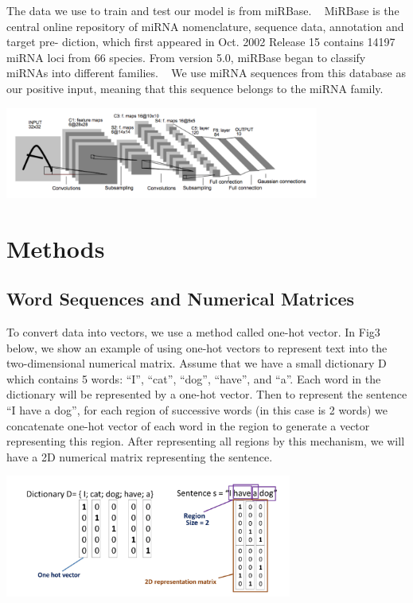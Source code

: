 \documentclass[letterpaper, 11pt]{article}
\newenvironment{Figure}
  {\par\medskip\noindent\minipage{\linewidth}}
  {\endminipage\par\medskip}
\begin{document}
\begin{multicols*}{2}
{The data we use to train and test our model is from miRBase.
~\cite{mirBase} 
MiRBase is the central online repository of miRNA nomenclature, sequence data, annotation and target pre- diction, which first appeared in Oct. 2002 Release 15 contains 14197 miRNA loci from 66 species. From version 5.0, miRBase began to classify miRNAs into different families.
~\cite{miRFam}
We use miRNA sequences from this database as our positive input, meaning that this sequence belongs to the miRNA family.

\begin{Figure}
\includegraphics[height = 3cm, width = \textwidth]{lenet.png}
\end{Figure}
}
\section{Methods}
{
\subsection{Word Sequences and Numerical Matrices}
To convert data into vectors, we use a method called one-hot vector. In Fig3 below, we show an example of using one-hot vectors to represent text into the two-dimensional numerical matrix. Assume that we have a small dictionary D which contains 5 words: “I”, “cat”, “dog”, “have”, and “a”. Each word in the dictionary will be represented by a one-hot vector. Then to represent the sentence “I have a dog”, for each region of successive words (in this case is 2 words) we concatenate one-hot vector of each word in the region to generate a vector representing this region. After representing all regions by this mechanism, we will have a 2D numerical matrix representing the sentence.
~\cite{DNA-sequence-classification}
\begin{Figure}
\includegraphics[height = 4cm, width = \textwidth]{word2vec.png}
\end{Figure}

}
\end{multicols*}
\end{document}
